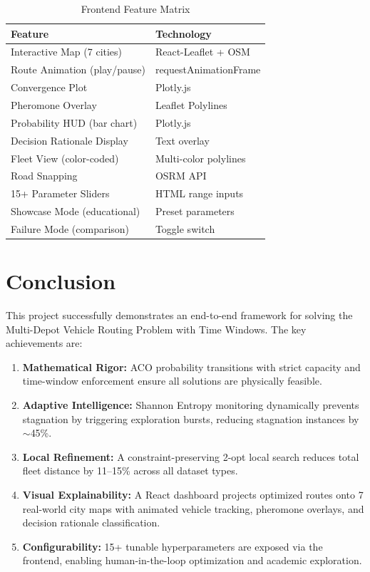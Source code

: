 \documentclass[10pt,conference]{IEEEtran}
\begin{document}
\begin{table}[h]
\caption{Frontend Feature Matrix}
\label{tab:frontend_features}
\begin{center}
\footnotesize
\begin{tabular}{|l|l|}
\hline
\textbf{Feature} & \textbf{Technology} \\
\hline
Interactive Map (7 cities) & React-Leaflet + OSM \\
Route Animation (play/pause) & requestAnimationFrame \\
Convergence Plot & Plotly.js \\
Pheromone Overlay & Leaflet Polylines \\
Probability HUD (bar chart) & Plotly.js \\
Decision Rationale Display & Text overlay \\
Fleet View (color-coded) & Multi-color polylines \\
Road Snapping & OSRM API \\
15+ Parameter Sliders & HTML range inputs \\
Showcase Mode (educational) & Preset parameters \\
Failure Mode (comparison) & Toggle switch \\
\hline
\end{tabular}
\end{center}
\end{table}

\section{Conclusion}

This project successfully demonstrates an end-to-end framework for solving the Multi-Depot Vehicle Routing Problem with Time Windows. The key achievements are:

\begin{enumerate}
    \item \textbf{Mathematical Rigor:} ACO probability transitions with strict capacity and time-window enforcement ensure all solutions are physically feasible.
    \item \textbf{Adaptive Intelligence:} Shannon Entropy monitoring dynamically prevents stagnation by triggering exploration bursts, reducing stagnation instances by $\sim$45\%.
    \item \textbf{Local Refinement:} A constraint-preserving 2-opt local search reduces total fleet distance by 11--15\% across all dataset types.
    \item \textbf{Visual Explainability:} A React dashboard projects optimized routes onto 7 real-world city maps with animated vehicle tracking, pheromone overlays, and decision rationale classification.
    \item \textbf{Configurability:} 15+ tunable hyperparameters are exposed via the frontend, enabling human-in-the-loop optimization and academic exploration.
\end{enumerate}
\end{document}

